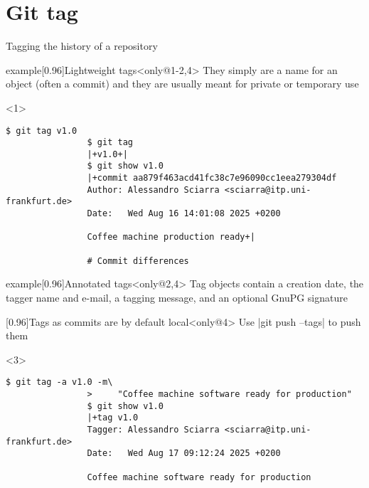 \documentclass[usenames,svgnames,14pt]{beamer}
\begin{document}
\section{Git tag}
\begin{frame}[fragile]{Tagging the history of a repository}
    \vspace{-8mm}
    \begin{overlayarea}{\textwidth}{0.7\textheight}
        \begin{varblock}{example}[0.96\textwidth]{Lightweight tags}<only@1-2,4>
            They simply are a name for an object (often a commit) and they are usually meant for private or temporary use
        \end{varblock}
        \begin{onlyenv}<1>
            \begin{lstlisting}[style=MyBash]
                $ git tag v1.0
                $ git tag
                |+v1.0+|
                $ git show v1.0
                |+commit aa879f463acd41fc38c7e96090cc1eea279304df
                Author: Alessandro Sciarra <sciarra@itp.uni-frankfurt.de>
                Date:   Wed Aug 16 14:01:08 2025 +0200

                Coffee machine production ready+|

                # Commit differences
            \end{lstlisting}
        \end{onlyenv}
        \begin{varblock}{example}[0.96\textwidth]{Annotated tags}<only@2,4>
            Tag objects contain a creation date, the tagger name and e-mail, a tagging message, and an optional GnuPG signature
        \end{varblock}
        \begin{varblock}{}[0.96\textwidth]{Tags as commits are by default local}<only@4>
            Use \;\bash|git push --tags|\; to push them
        \end{varblock}
        \begin{onlyenv}<3>
            \begin{lstlisting}[style=MyBash, aboveskip=7mm]
                $ git tag -a v1.0 -m\
                >     "Coffee machine software ready for production"
                $ git show v1.0
                |+tag v1.0
                Tagger: Alessandro Sciarra <sciarra@itp.uni-frankfurt.de>
                Date:   Wed Aug 17 09:12:24 2025 +0200

                Coffee machine software ready for production


\end{lstlisting}
\end{onlyenv}
\end{overlayarea}
\end{frame}
\end{document}
